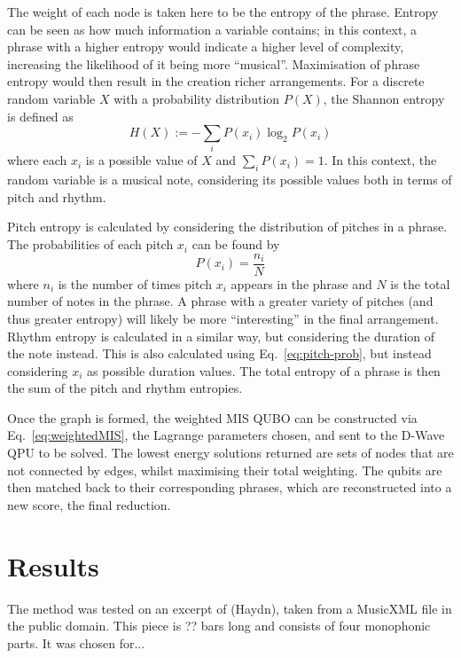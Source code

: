 \documentclass[12pt]{article}
\begin{document}
The weight of each node is taken here to be the entropy of the phrase. Entropy can be seen as how much  information a variable contains; in this context, a phrase with a higher entropy would indicate a higher level of complexity, increasing the likelihood of it being more ``musical''. Maximisation of phrase entropy would then result in the creation richer arrangements. For a discrete random variable $X$ with a probability distribution $P(X)$, the Shannon entropy is defined as
\begin{equation}
    H(X):=-\sum_i P(x_i)\log_2 P(x_i)
    \label{eq:entropy}
\end{equation}
where each $x_i$ is a possible value of $X$ and ${\sum_i P(x_i)=1}$. In this context, the random variable is a musical note, considering its possible values both in terms of pitch and rhythm.

Pitch entropy is calculated by considering the distribution of pitches in a phrase. The probabilities of each pitch $x_i$ can be found by
\begin{equation}
    P(x_i)=\frac{n_i}{N}
    \label{eq:pitch-prob}
\end{equation}
where $n_i$ is the number of times pitch $x_i$ appears in the phrase and $N$ is the total number of notes in the phrase. A phrase with a greater variety of pitches (and thus greater entropy) will likely be more ``interesting'' in the final arrangement.
Rhythm entropy is calculated in a similar way, but considering the duration of the note instead. This is also calculated using Eq.\ \ref{eq:pitch-prob}, but instead considering $x_i$ as possible duration values.
The total entropy of a phrase is then the sum of the pitch and rhythm entropies.

Once the graph is formed, the weighted MIS QUBO can be constructed via Eq.\ \ref{eq:weightedMIS}, the Lagrange parameters chosen, and sent to the D-Wave QPU to be solved. The lowest energy solutions returned are sets of nodes that are not connected by edges, whilst maximising their total weighting. The qubits are then matched back to their corresponding phrases, which are reconstructed into a new score, the final reduction.

\section{Results}

The method was tested on an excerpt of (Haydn), taken from a MusicXML file in the public domain. This piece is ?? bars long and consists of four monophonic parts. It was chosen for...
\end{document}
